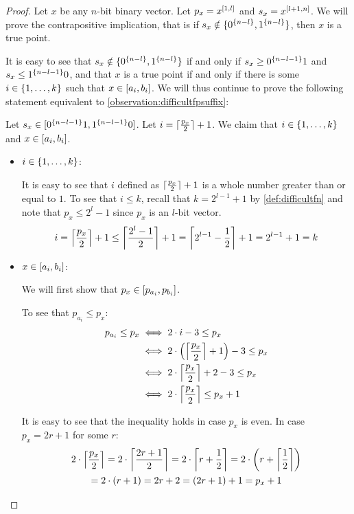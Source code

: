 \begin{proof}
Let $x$ be any $n$-bit binary vector.
Let $p_x = \bits{x}{1}{l}$ and $s_x = \bits{x}{l+1}{n}$.
We will prove the contrapositive
implication,
that is
if $s_x \notin \curly{\rep{0}{n-l}, \rep{1}{n-l}}$,
then $x$ is a true point.

It is easy to see that
$s_x \notin \curly{\rep{0}{n-l}, \rep{1}{n-l}}$
if and only if
$s_x \geq \rep{0}{n-l-1} 1$
and $s_x \leq \rep{1}{n-l-1} 0$,
and that $x$ is a true point
if and only if
there is some $i \in \curly{1, \ldots, k}$
such that $x \in \interval{a_i}{b_i}$.
We will thus continue to prove the following statement
equivalent to \cref{observation:difficultfpsuffix}:
\begin{claim}
\label{claim:difficultfpsuffix}
Let
$s_x \in \interval{\rep{0}{n-l-1} 1}{\rep{1}{n-l-1} 0}$.
Let $i = \ceil{\frac{p_x}{2}} + 1$.
We claim that $i \in \curly{1, \ldots, k}$
and $x \in \interval{a_i}{b_i}$.
\end{claim}

\begin{itemize}
\item $i \in \curly{1, \ldots, k}$:

It is easy to see that $i$
defined as $\ceil{\frac{p_x}{2}} + 1$
is a whole number greater than or equal to $1$.
To see that $i \leq k$,
recall that $k = 2^{l-1} + 1$ by \cref{def:difficultfn}
and note that $p_x \leq 2^l-1$
since $p_x$ is an $l$-bit vector.
$$
i = \ceil*{\frac{p_x}{2}} + 1
\leq \ceil*{\frac{2^l-1}{2}} + 1
= \ceil*{2^{l-1} - \frac{1}{2}} + 1
= 2^{l-1} + 1
= k
$$

\item $x \in \interval{a_i}{b_i}$:

We will first show that $p_x \in \interval{p_{a_i}}{p_{b_i}}$.

To see that $p_{a_i} \leq p_x$:
\begin{align}
p_{a_i} \leq p_x
&\iff 2 \cdot i - 3 \leq p_x \nonumber \\
&\iff 2 \cdot \round*{\ceil*{\frac{p_x}{2}} + 1} - 3 \leq p_x \nonumber \\
&\iff 2 \cdot \ceil*{\frac{p_x}{2}} + 2 - 3 \leq p_x \nonumber \\
&\iff 2 \cdot \ceil*{\frac{p_x}{2}} \leq p_x + 1
\label{ineq:difficultprefix}
\end{align}

It is easy to see that
the inequality  holds
in case $p_x$ is even.
In case $p_x = 2r + 1$ for some $r$:
\begin{multline*}
2 \cdot \ceil*{\frac{p_x}{2}}
= 2 \cdot \ceil*{\frac{2r + 1}{2}}
= 2 \cdot \ceil*{r + \frac{1}{2}}
= 2 \cdot \round*{r + \ceil*{\frac{1}{2}}} \\
= 2 \cdot (r + 1)
= 2r + 2
= (2r + 1) + 1
= p_x + 1
\end{multline*}


\end{itemize}
\end{proof}
